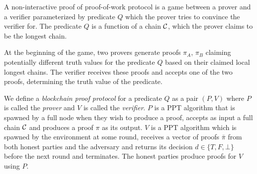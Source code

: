 A non-interactive proof of proof-of-work protocol is a game between a prover
and a verifier parameterized by predicate $Q$ which the prover tries to
convince the verifier for. The predicate $Q$ is a function of a chain $\mathcal{C}$,
which the prover claims to be the longest chain.

At the beginning of the game, two provers generate proofs $\pi_A$, $\pi_B$
claiming potentially different truth values for the predicate $Q$ based on
their claimed local longest chains. The verifier receives these proofs and
accepts one of the two proofs, determining the truth value of the predicate.

We define a \textit{blockchain proof protocol} for a predicate $Q$ as a pair
$(P, V)$ where $P$ is called the \textit{prover} and $V$ is called the
\textit{verifier}. $P$ is a PPT algorithm that is spawned by a full node
when they wish to produce a proof, accepts as input a full chain $\mathcal{C}$ and
produces a proof $\pi$ as its output. $V$ is a PPT algorithm which is spawned
by the environment at some round, receives a vector of proofs $\bar{\pi}$ from
both honest parties and the adversary and returns its decision $d \in \{T, F,
\bot\}$ before the next round and terminates. The honest parties produce proofs
for $V$ using $P$.
